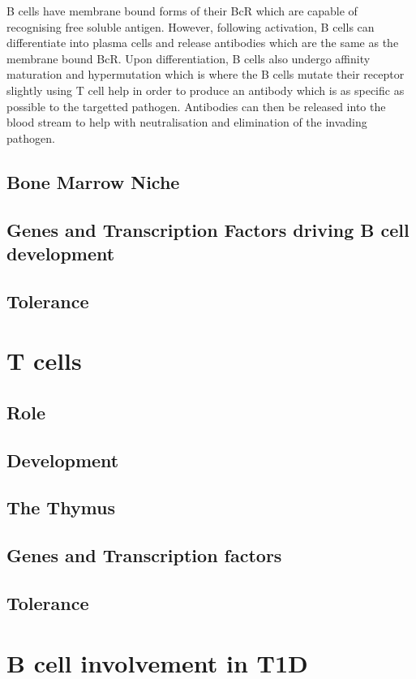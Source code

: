 B cells have membrane bound forms of their BcR which are capable of recognising free soluble antigen.
However, following activation, B cells can differentiate into plasma cells and release antibodies which are the same as the membrane bound BcR.
Upon differentiation, B cells also undergo affinity maturation and hypermutation which is where the B cells mutate their receptor slightly using T cell help in order to produce an antibody which is as specific as possible to the targetted pathogen.
Antibodies can then be released into the blood stream to help with neutralisation and elimination of the invading pathogen.


\subsection{Bone Marrow Niche}
\subsection{Genes and Transcription Factors driving B cell development}
\subsection{Tolerance}

\section{T cells}
\subsection{Role}
\subsection{Development}
\subsection{The Thymus}
\subsection{Genes and Transcription factors}
\subsection{Tolerance}



\section{B cell involvement in T1D}

